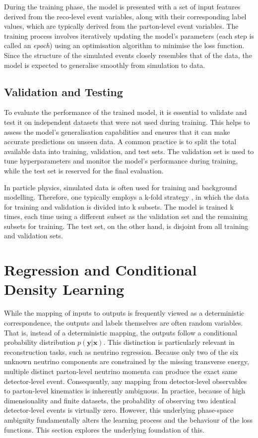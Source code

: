 During the training phase, the model is presented with a set of input features derived from the reco-level event variables, along with their corresponding label values, which are typically derived from the parton-level event variables.
The training process involves iteratively updating the model's parameters (each step is called an \textit{epoch}) using an optimisation algorithm to minimise the loss function. Since the structure of the simulated events closely resembles that of the data, the model is expected to generalise smoothly from simulation to data.

\subsection{Validation and Testing}
To evaluate the performance of the trained model, it is essential to validate and test it on independent datasets that were not used during training. This helps to assess the model's generalisation capabilities and ensures that it can make accurate predictions on unseen data. A common practice is to split the total available data into training, validation, and test sets. The validation set is used to tune hyperparameters and monitor the model's performance during training, while the test set is reserved for the final evaluation.

In particle physics, simulated data is often used for training and background modelling. Therefore, one typically employs a k-fold strategy \cite{k-folding}, in which the data for training and validation is divided into k subsets. The model is trained k times, each time using a different subset as the validation set and the remaining subsets for training. The test set, on the other hand, is disjoint from all training and validation sets.


\section{Regression and Conditional Density Learning}
\label{sec:regression_vs_conditional_density}
While the mapping of inputs to outputs is frequently viewed as a deterministic correspondence, the outputs and labels themselves are often random variables. That is, instead of a deterministic mapping, the outputs follow a conditional probability distribution $p(\mathbf{y}|\mathbf{x})$. This distinction is particularly relevant in reconstruction tasks, such as neutrino regression.  Because only two of the six unknown neutrino components are constrained by the missing transverse energy, multiple distinct parton-level neutrino momenta can produce the exact same detector-level event. Consequently, any mapping from detector-level observables to parton-level kinematics is inherently ambiguous. In practice, because of high dimensionality and finite datasets, the probability of observing two identical detector-level events is virtually zero. However, this underlying phase-space ambiguity fundamentally alters the learning process and the behaviour of the loss functions.
This section explores the underlying foundation of this.


